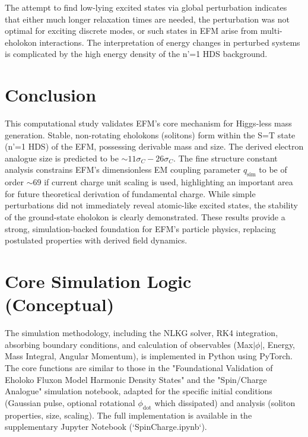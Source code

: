 \documentclass[11pt]{article}
\begin{document}
The attempt to find low-lying excited states via global perturbation indicates that either much longer relaxation times are needed, the perturbation was not optimal for exciting discrete modes, or such states in EFM arise from multi-eholokon interactions. The interpretation of energy changes in perturbed systems is complicated by the high energy density of the n'=1 HDS background.

\section{Conclusion}
This computational study validates EFM's core mechanism for Higgs-less mass generation. Stable, non-rotating eholokons (solitons) form within the S=T state (n'=1 HDS) of the EFM, possessing derivable mass and size. The derived electron analogue size is predicted to be \( \sim 11\sigma_C - 26\sigma_C \). The fine structure constant analysis constrains EFM's dimensionless EM coupling parameter \(q_{\text{sim}}\) to be of order \( \sim 69 \) if current charge unit scaling is used, highlighting an important area for future theoretical derivation of fundamental charge. While simple perturbations did not immediately reveal atomic-like excited states, the stability of the ground-state eholokon is clearly demonstrated. These results provide a strong, simulation-backed foundation for EFM's particle physics, replacing postulated properties with derived field dynamics.

\appendix
\section{Core Simulation Logic (Conceptual)}
\label{app:code_mass_gen_final}
The simulation methodology, including the NLKG solver, RK4 integration, absorbing boundary conditions, and calculation of observables (Max\(|\phi|\), Energy, Mass Integral, Angular Momentum), is implemented in Python using PyTorch. The core functions are similar to those in the "Foundational Validation of Eholoko Fluxon Model Harmonic Density States" \citep{emvula2025efm_hds_validated} and the "Spin/Charge Analogue" simulation notebook, adapted for the specific initial conditions (Gaussian pulse, optional rotational \(\phi_{\text{dot}}\) which dissipated) and analysis (soliton properties, size, scaling). The full implementation is available in the supplementary Jupyter Notebook (`SpinCharge.ipynb`).
\end{document}
